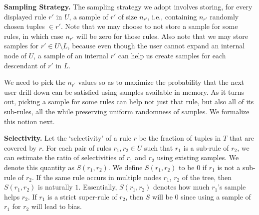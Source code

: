 \documentclass[10pt,journal,compsoc]{IEEEtran}
\newcounter{prob}
\newcommand{\stitle}[1]{\vspace{0.5em}\noindent\textbf{#1}}
\begin{document}
{%

\stitle{Sampling Strategy.} The sampling strategy we adopt involves storing, 
for every displayed rule $r'$ in $U$, a sample of $r'$ of size $n_{r'}$, i.e., 
containing $n_{r'}$ randomly chosen tuples $\in r'$.
Note that we may choose to not store a sample for some rules, in which case $n_{r'}$
will be zero for those rules. Also note that we may store samples for $r' \in U \setminus L$, because even though the user cannot expand an internal node of $U$, a sample of an internal $r'$ can help us create samples for each descendant of $r'$ in $L$.

We need to pick the $n_{r^{\prime}}$ values so as to maximize the probability that the next user drill down can be satisfied using samples available in memory. 
As it turns out, picking a sample for some rules can help not just that rule, but
also all of its sub-rules, all the while preserving uniform randomness of samples. We formalize this notion next.


\stitle{Selectivity.} 
Let the `selectivity' of a rule $r$ be the fraction of tuples in $T$ that are covered by $r$. 
For each pair of rules $r_1, r_2 \in U$ such that $r_1$ is a sub-rule of $r_2$, we can estimate the ratio of selectivities of $r_1$ and $r_2$ using existing samples. We denote this quantity as $S(r_1, r_2)$. 
We define $S(r_1, r_2)$ to be $0$ if $r_1$ is not a sub-rule of $r_2$. 
If the same rule occurs in multiple nodes $r_1$, $r_2$ of the tree, then $S(r_1, r_2)$ is naturally $1$. 
Essentially, $S(r_1, r_2)$ denotes how much $r_1$'s sample helps $r_2$. 
If $r_1$ is a strict super-rule of $r_2$, then $S$ will be $0$ since using a sample of $r_1$
for $r_2$ will lead to bias.

}
\end{document}
